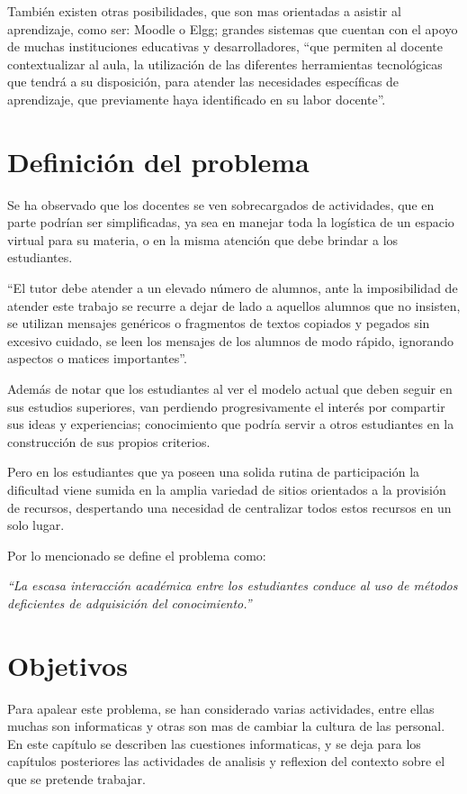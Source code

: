 También existen otras posibilidades, que son mas orientadas a asistir al aprendizaje, como ser: Moodle o Elgg; grandes
sistemas que cuentan con el apoyo de muchas instituciones educativas y desarrolladores, “que permiten al docente
contextualizar al aula, la utilización de las diferentes herramientas tecnológicas que tendrá a su disposición, para
atender las  necesidades específicas de aprendizaje, que previamente haya identificado en su labor docente”\cite{Gonzalez}.

\section{Definición del problema}
Se ha observado que los docentes se ven sobrecargados de actividades, que en parte podrían ser simplificadas, ya sea en 
manejar toda la logística de un espacio virtual para su materia, o en la misma atención que debe brindar a los
estudiantes.

“El tutor debe atender a un elevado número de alumnos, ante la imposibilidad de atender este trabajo se recurre a dejar 
de lado a aquellos alumnos que no insisten, se utilizan mensajes genéricos o fragmentos de textos copiados y pegados sin
excesivo cuidado, se leen los mensajes de los alumnos de modo rápido, ignorando aspectos o matices
importantes”\cite{Bartolome}.

Además de notar que los estudiantes al ver el modelo actual que deben seguir en sus estudios superiores, van perdiendo 
progresivamente el interés por compartir sus ideas y experiencias; conocimiento que podría servir a otros estudiantes en
la construcción de sus propios criterios.

Pero en los estudiantes que ya poseen una solida rutina de participación la dificultad viene sumida en la amplia variedad
de sitios orientados a la provisión de recursos, despertando una necesidad de centralizar todos estos recursos en un
solo lugar.

Por lo mencionado se define el problema como:

\emph{“La escasa interacción académica entre los estudiantes conduce al uso de métodos deficientes de adquisición del
conocimiento.”}

\section{Objetivos}
Para apalear este problema, se han considerado varias actividades, entre ellas muchas son informaticas y otras son mas
de cambiar la cultura de las personal. En este capítulo se describen las cuestiones informaticas, y se deja para los
capítulos posteriores las actividades de analisis y reflexion del contexto sobre el que se pretende trabajar.


